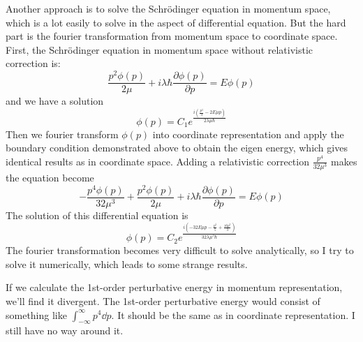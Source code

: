 \documentclass{article}
\begin{document}
Another approach is to solve the Schr\"odinger equation in momentum space, which is a lot easily to solve in the aspect of differential equation. But the hard part is the fourier transformation from momentum space to coordinate space. First, the Schr\"odinger equation in momentum space without relativistic correction is:
\begin{equation}
    \frac{p^2 \phi (p)}{2 \mu }+i \lambda  \hbar  \frac{\partial \phi (p)}{\partial p}=E \phi (p)
\end{equation}
and we have a solution
\begin{equation}
  \phi(p)=C_1e^{\frac{i \left(\frac{p^3}{3}-2 E \mu  p\right)}{2 \lambda  \mu  \hbar }}
\end{equation}
Then we fourier transform $\phi(p)$ into coordinate representation and apply the boundary condition demonstrated above to obtain the eigen energy, which gives identical results as in coordinate space. Adding a relativistic correction $\frac{p^4}{32\mu^3}$ makes the equation become
\begin{equation}
  -\frac{p^4 \phi (p)}{32 \mu^3 }+\frac{p^2 \phi (p)}{2 \mu }+i \lambda  \hbar  \frac{\partial \phi (p)}{\partial p}=E \phi (p)
\end{equation}
The solution of this differential equation is
\begin{equation}
  \phi(p)=C_2e^{\frac{i \left(-32 E \mu  p-\frac{p^5}{5}+\frac{16 p^3}{3}\right)}{32 \lambda  \mu^3  \hbar }}
\end{equation}
The fourier transformation becomes very difficult to solve analytically, so I try to solve it numerically, which leads to some strange results.

If we calculate the 1st-order perturbative energy in momentum representation, we'll find it divergent. The 1st-order perturbative energy would consist of something like $\int_{-\infty}^{\infty}p^4\dd p$. It should be the same as in coordinate representation. I still have no way around it.
\end{document}
